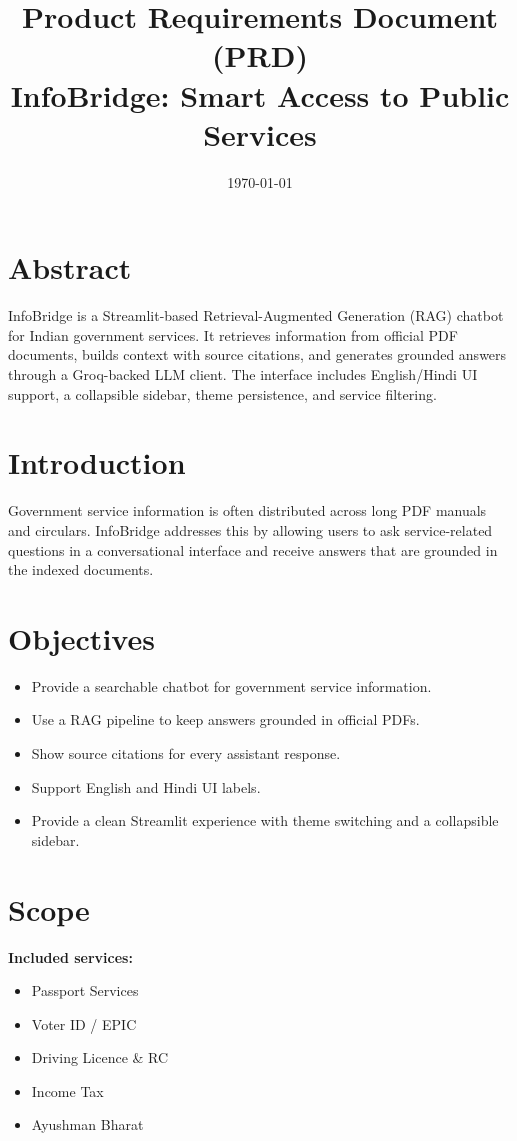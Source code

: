 \documentclass[11pt]{article}
\title{\textbf{Product Requirements Document (PRD)}\\
InfoBridge: Smart Access to Public Services}
\date{\today}
\begin{document}
\maketitle

\section{Abstract}
InfoBridge is a Streamlit-based Retrieval-Augmented Generation (RAG) chatbot for Indian government services. It retrieves information from official PDF documents, builds context with source citations, and generates grounded answers through a Groq-backed LLM client. The interface includes English/Hindi UI support, a collapsible sidebar, theme persistence, and service filtering.

\section{Introduction}
Government service information is often distributed across long PDF manuals and circulars. InfoBridge addresses this by allowing users to ask service-related questions in a conversational interface and receive answers that are grounded in the indexed documents.

\section{Objectives}
\begin{itemize}
    \item Provide a searchable chatbot for government service information.
    \item Use a RAG pipeline to keep answers grounded in official PDFs.
    \item Show source citations for every assistant response.
    \item Support English and Hindi UI labels.
    \item Provide a clean Streamlit experience with theme switching and a collapsible sidebar.
\end{itemize}

\section{Scope}
\textbf{Included services:}
\begin{itemize}
    \item Passport Services
    \item Voter ID / EPIC
    \item Driving Licence \& RC
    \item Income Tax
    \item Ayushman Bharat
\end{itemize}
\end{document}
